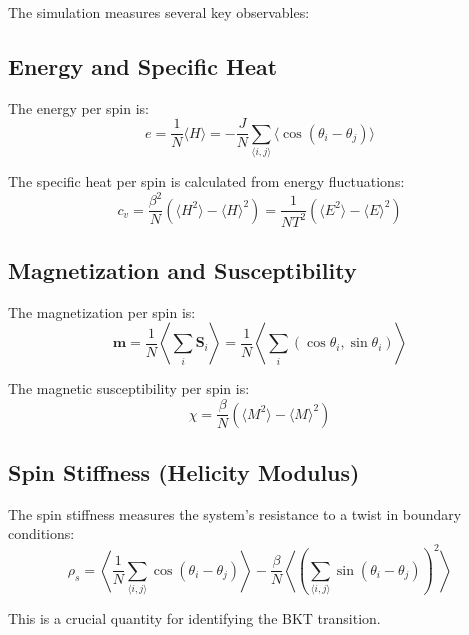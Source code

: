 \documentclass[12pt,a4paper]{article}
\begin{document}
The simulation measures several key observables:

\subsection{Energy and Specific Heat}

The energy per spin is:
\begin{equation}
e = \frac{1}{N}\langle H \rangle = -\frac{J}{N} \sum_{\langle i,j \rangle} \langle\cos(\theta_i - \theta_j)\rangle
\end{equation}

The specific heat per spin is calculated from energy fluctuations:
\begin{equation}
c_v = \frac{\beta^2}{N}(\langle H^2 \rangle - \langle H \rangle^2) = \frac{1}{NT^2}(\langle E^2 \rangle - \langle E \rangle^2)
\end{equation}

\subsection{Magnetization and Susceptibility}

The magnetization per spin is:
\begin{equation}
\mathbf{m} = \frac{1}{N}\left\langle \sum_i \mathbf{S}_i \right\rangle = \frac{1}{N}\left\langle \sum_i (\cos\theta_i, \sin\theta_i) \right\rangle
\end{equation}

The magnetic susceptibility per spin is:
\begin{equation}
\chi = \frac{\beta}{N}(\langle M^2 \rangle - \langle M \rangle^2)
\end{equation}

\subsection{Spin Stiffness (Helicity Modulus)}

The spin stiffness measures the system's resistance to a twist in boundary conditions:
\begin{equation}
\rho_s = \left\langle \frac{1}{N} \sum_{\langle i,j \rangle} \cos(\theta_i - \theta_j) \right\rangle - \frac{\beta}{N} \left\langle \left(\sum_{\langle i,j \rangle} \sin(\theta_i - \theta_j)\right)^2 \right\rangle
\end{equation}

This is a crucial quantity for identifying the BKT transition.
\end{document}
